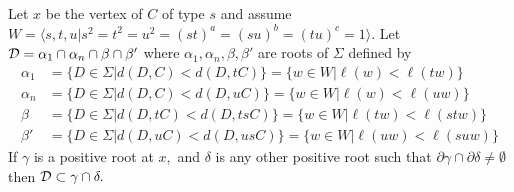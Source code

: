 \documentclass[class=book, crop=false,12 pt]{standalone}
\begin{document}
\begin{lemma}
	\label{containD}
	Let $x$ be the vertex of $C$ of type $s$ and assume $W=\langle s,t,u|s^2=t^2=u^2=(st)^a=(su)^b=(tu)^c=1\rangle.$ Let $\mathcal{D}=\alpha_1\cap \alpha_n\cap \beta\cap \beta'$ where $\alpha_1,\alpha_n,\beta,\beta'$ are roots of $\Sigma$ defined by
\begin{align*}
	\alpha_1&=\{D\in \Sigma|d(D,C)<d(D,tC)\}=\{w\in W|\ell(w)<\ell(tw)\}\\
	\alpha_n&=\{D\in \Sigma|d(D,C)<d(D,uC)\}=\{w\in W|\ell(w)<\ell(uw)\}\\
	\beta&=\{D\in \Sigma|d(D,tC)<d(D,tsC)\}=\{w\in W|\ell(tw)<\ell(stw)\}\\
	\beta'&=\{D\in \Sigma|d(D,uC)<d(D,usC)\}=\{w\in W|\ell(uw)<\ell(suw)\}
\end{align*}
If $\gamma$ is a positive root at $x,$ and $\delta$ is any other positive root such that $\partial\gamma\cap \partial\delta\neq \emptyset$ then $\mathcal{D}\subset \gamma\cap \delta.$
\end{lemma}
\end{document}
